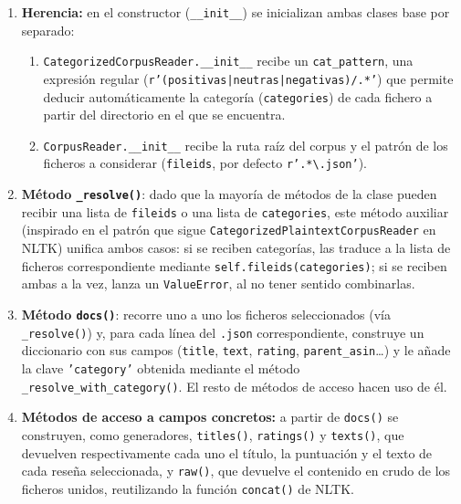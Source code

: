 \documentclass[10pt,a4paper]{article}
\begin{document}
\begin{enumerate}
    \item \textbf{Herencia:} en el constructor (\texttt{\_\_init\_\_}) se inicializan ambas clases base por separado:
    \begin{enumerate}
        \item \texttt{CategorizedCorpusReader.\_\_init\_\_} recibe un \texttt{cat\_pattern}, una expresión regular 
        (\texttt{r'(positivas|neutras|negativas)/.*'}) que permite deducir automáticamente la categoría (\texttt{categories}) 
        de cada fichero a partir del directorio en el que se encuentra.
        \item \texttt{CorpusReader.\_\_init\_\_} recibe la ruta raíz del corpus y el patrón de los ficheros a considerar 
        (\texttt{fileids}, por defecto \texttt{r'.*\textbackslash.json'}).
    \end{enumerate}

    \item \textbf{Método \texttt{\_resolve()}}: dado que la mayoría de métodos de la clase pueden recibir una lista de 
    \texttt{fileids} o una lista de \texttt{categories}, este método auxiliar (inspirado en el patrón que sigue 
    \texttt{CategorizedPlaintextCorpusReader} en NLTK) unifica ambos casos: si se reciben categorías, las traduce a 
    la lista de ficheros correspondiente mediante \texttt{self.fileids(categories)}; si se reciben ambas a la vez, 
    lanza un \texttt{ValueError}, al no tener sentido combinarlas.

    \item \textbf{Método \texttt{docs()}}: recorre uno a uno los ficheros seleccionados (vía \texttt{\_resolve()}) y, 
    para cada línea del \texttt{.json} correspondiente, construye un diccionario con sus campos (\texttt{title}, 
    \texttt{text}, \texttt{rating}, \texttt{parent\_asin}\ldots) y le añade la clave \texttt{'category'} obtenida 
    mediante el método \texttt{\_resolve\_with\_category()}. El resto de métodos de acceso hacen uso de él.

    \item \textbf{Métodos de acceso a campos concretos:} a partir de \texttt{docs()} se construyen, como generadores, 
    \texttt{titles()}, \texttt{ratings()} y \texttt{texts()}, que devuelven respectivamente cada uno el título, la puntuación 
    y el texto de cada reseña seleccionada, y \texttt{raw()}, que devuelve el contenido en crudo de los ficheros unidos, 
    reutilizando la función \texttt{concat()} de NLTK.


\end{enumerate}
\end{document}
